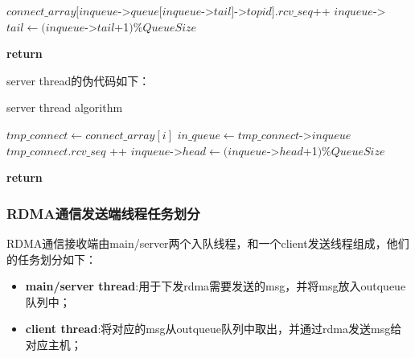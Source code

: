 {\begin{algorithm}
\begin{algorithmic}[1]
            \State
            \State $connect\_array[inqueue$->$queue[inqueue$->$tail]$->$topid].rcv\_seq $++
            \State $inqueue$->$tail \gets (inqueue$->$tail$+1$) \% QueueSize$
            \EndIf
            \EndWhile

            \State
            \State {}
            \State \textbf{return}
            \EndFunction
        \end{algorithmic}
    \end{algorithm}

    \newpage
    server thread的伪代码如下：
    \begin{algorithm}
        \caption{server thread algorithm}
        \begin{algorithmic}[1] %
            \State {}

            \State $tmp\_connect \gets connect\_array[i]$
            \State $in\_queue \gets tmp\_connect$->$inqueue$
            \State {}
            \State {}
            \State {}
            \State $tmp\_connect.rcv\_seq$ ++
            \EndIf
            \State $inqueue$->$head \gets (inqueue$->$head$+1$) \% QueueSize$
            \EndIf
            \EndFor

            \State {}
            \EndIf
            \EndWhile
            \State \textbf{return}
            \EndProcedure
        \end{algorithmic}
    \end{algorithm}

    \newpage
    \subsubsection{RDMA通信发送端线程任务划分}
    RDMA通信接收端由main/server两个入队线程，和一个client发送线程组成，他们的任务划分如下：

    \begin{itemize}[leftmargin=*, nosep]
        \item \textbf{main/server thread}:用于下发rdma需要发送的msg，并将msg放入outqueue队列中；
        \item \textbf{client thread}:将对应的msg从outqueue队列中取出，并通过rdma发送msg给对应主机；
    \end{itemize}

}
